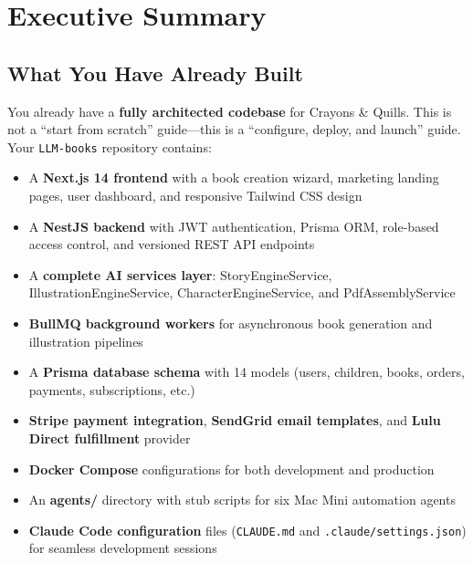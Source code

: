 \documentclass[12pt, letterpaper, oneside]{book}
\begin{document}
\tableofcontents
\newpage

\chapter*{Executive Summary}

\section*{What You Have Already Built}

You already have a \textbf{fully architected codebase} for Crayons \& Quills. This is not a ``start from scratch'' guide---this is a ``configure, deploy, and launch'' guide. Your \texttt{LLM-books} repository contains:

\begin{itemize}[leftmargin=2em, itemsep=2pt]
  \item A \textbf{Next.js 14 frontend} with a book creation wizard, marketing landing pages, user dashboard, and responsive Tailwind CSS design
  \item A \textbf{NestJS backend} with JWT authentication, Prisma ORM, role-based access control, and versioned REST API endpoints
  \item A \textbf{complete AI services layer}: StoryEngineService, IllustrationEngineService, CharacterEngineService, and PdfAssemblyService
  \item \textbf{BullMQ background workers} for asynchronous book generation and illustration pipelines
  \item A \textbf{Prisma database schema} with 14 models (users, children, books, orders, payments, subscriptions, etc.)
  \item \textbf{Stripe payment integration}, \textbf{SendGrid email templates}, and \textbf{Lulu Direct fulfillment} provider
  \item \textbf{Docker Compose} configurations for both development and production
  \item An \textbf{agents/} directory with stub scripts for six Mac Mini automation agents
  \item \textbf{Claude Code configuration} files (\texttt{CLAUDE.md} and \texttt{.claude/settings.json}) for seamless development sessions
\end{itemize}
\end{document}
